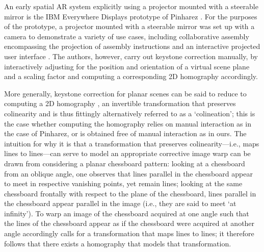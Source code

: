 \documentclass[review]{elsarticle}
\begin{document}
An early spatial AR system explicitly using a projector mounted with a steerable mirror is the IBM Everywhere Displays prototype of Pinharez \cite{pinhanez2001everywhere}. For the purposes of the prototype, a projector mounted with a steerable mirror was set up with a camera to demonstrate a variety of use cases, including collaborative assembly encompassing the projection of assembly instructions and an interactive projected user interface \cite{kjeldsen2002interacting,pinhanez2003applications}. The authors, however, carry out keystone correction manually, by interactively adjusting for the position and orientation of a virtual scene plane and a scaling factor and computing a corresponding 2D homography accordingly. %

More generally, keystone correction for planar scenes can be said to reduce to computing a 2D homography \cite{Hartley2004}, an invertible transformation that preserves colinearity and is thus fittingly alternatively referred to as a `colineation'; this is the case whether computing the homography relies on manual interaction as in the case of Pinharez, or is obtained free of manual interaction as in ours. The intuition for why it is that a transformation that preserves colinearity---i.e., maps lines to lines---can serve to model an appropriate corrective image warp can be drawn from considering a planar chessboard pattern: looking at a chessboard from an oblique angle, one observes that lines parallel in the chessboard appear to meet in respective vanishing points, yet remain lines; looking at the same chessboard frontally with respect to the plane of the chessboard, lines parallel in the chessboard appear parallel in the image (i.e., they are said to meet `at infinity'). To warp an image of the chessboard acquired at one angle such that the lines of the chessboard appear as if the chessboard were acquired at another angle accordingly calls for a transformation that maps lines to lines; it therefore follows that there exists a homography that models that transformation.
\end{document}
